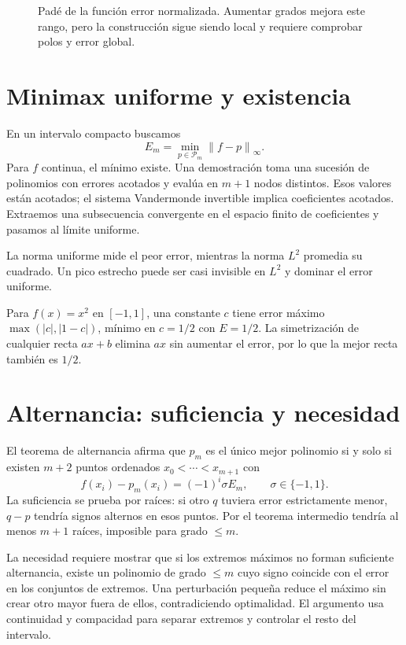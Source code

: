 \documentclass[11pt,a4paper]{article}
\newcommand{\norm}[1]{\left\lVert #1\right\rVert}
\theoremstyle{definition}
\begin{document}
\begin{figure}[htbp]
\caption{Padé de la función error normalizada. Aumentar grados mejora este rango, pero la construcción sigue siendo local y requiere comprobar polos y error global.}\label{fig:cdf-12}\end{figure}

\section{Minimax uniforme y existencia}
En un intervalo compacto buscamos
\[
E_m=\min_{p\in\mathcal P_m}\norm{f-p}_\infty.
\]
Para $f$ continua, el mínimo existe. Una demostración toma una sucesión de polinomios con errores acotados y evalúa en $m+1$ nodos distintos. Esos valores están acotados; el sistema Vandermonde invertible implica coeficientes acotados. Extraemos una subsecuencia convergente en el espacio finito de coeficientes y pasamos al límite uniforme.

La norma uniforme mide el peor error, mientras la norma $L^2$ promedia su cuadrado. Un pico estrecho puede ser casi invisible en $L^2$ y dominar el error uniforme.

Para $f(x)=x^2$ en $[-1,1]$, una constante $c$ tiene error máximo $\max(|c|,|1-c|)$, mínimo en $c=1/2$ con $E=1/2$. La simetrización de cualquier recta $ax+b$ elimina $ax$ sin aumentar el error, por lo que la mejor recta también es $1/2$.

\section{Alternancia: suficiencia y necesidad}
El teorema de alternancia afirma que $p_m$ es el único mejor polinomio si y solo si existen $m+2$ puntos ordenados
$x_0<\cdots<x_{m+1}$ con
\[
f(x_i)-p_m(x_i)=(-1)^i\sigma E_m,\qquad \sigma\in\{-1,1\}.
\]
La suficiencia se prueba por raíces: si otro $q$ tuviera error estrictamente menor, $q-p$ tendría signos alternos en esos puntos. Por el teorema intermedio tendría al menos $m+1$ raíces, imposible para grado $\le m$.

La necesidad requiere mostrar que si los extremos máximos no forman suficiente alternancia, existe un polinomio de grado $\le m$ cuyo signo coincide con el error en los conjuntos de extremos. Una perturbación pequeña reduce el máximo sin crear otro mayor fuera de ellos, contradiciendo optimalidad. El argumento usa continuidad y compacidad para separar extremos y controlar el resto del intervalo.
\end{document}
